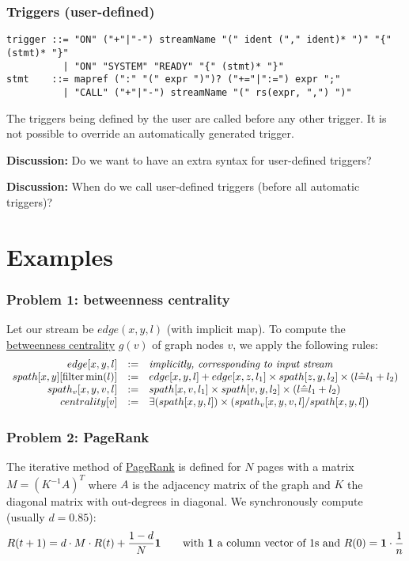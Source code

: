 \documentclass[11pt]{article}
\newlength{\dlen}
\def\discuss#1{\par\hspace{2em}
\setlength{\dlen}{\textwidth}
\addtolength{\dlen}{-2em}
\begin{minipage}{\dlen}\footnotesize {\bf\color{red} Discussion:} #1\end{minipage}\par}
\begin{document}
\subsubsection*{Triggers (user-defined)}
\begin{verbatim}
trigger ::= "ON" ("+"|"-") streamName "(" ident ("," ident)* ")" "{" (stmt)* "}"
          | "ON" "SYSTEM" "READY" "{" (stmt)* "}"
stmt    ::= mapref (":" "(" expr ")")? ("+="|":=") expr ";"
          | "CALL" ("+"|"-") streamName "(" rs(expr, ",") ")"
\end{verbatim}
The triggers being defined by the user are called before any other trigger. It is not possible to override an automatically generated trigger.
\discuss{Do we want to have an extra syntax for user-defined triggers?}
\discuss{When do we call user-defined triggers (before all automatic triggers)?}

\section*{Examples}
\subsubsection*{Problem 1: betweenness centrality}
Let our stream be $edge(x,y,l)$ (with implicit map). To compute the \href{http://en.wikipedia.org/wiki/Betweenness_centrality}{betweenness centrality} $g(v)$ of graph nodes $v$, we apply the following rules:
\[\begin{array}{rcl}
edge[x,y,l] &:=& \text{\it implicitly, corresponding to input stream} \\
spath[x,y][{\rm filter} \min(l)] &:=& edge[x,y,l] +  edge[x,z,l_1] \times spath[z,y,l_2] \times (l\hat= l_1+l_2)\\
spath_v[x,y,v,l] &:=& spath[x,v,l_1] \times spath[v,y,l_2] \times (l\hat= l_1+l_2)\\
centrality[v] &:=& \exists(spath[x,y,l]) \times (spath_v[x,y,v,l] / spath[x,y,l])
\end{array}\]

\subsubsection*{Problem 2: PageRank} \label{pb:pagerank}
The iterative method of \href{http://en.wikipedia.org/wiki/PageRank#Iterative}{PageRank} is defined for $N$ pages with a matrix $M=(K^{-1} A)^T$ where $A$ is the adjacency matrix of the graph and $K$ the diagonal matrix with out-degrees in diagonal. We synchronously compute (usually $d=0.85$):
\[R(t+1)=d\cdot M\cdot R(t)+\dfrac{1-d}{N}{\bf 1} \qquad \text{with {\bf 1} a column vector of 1s and }R(0)={\bf 1}\cdot \frac{1}{n}\]
\end{document}
